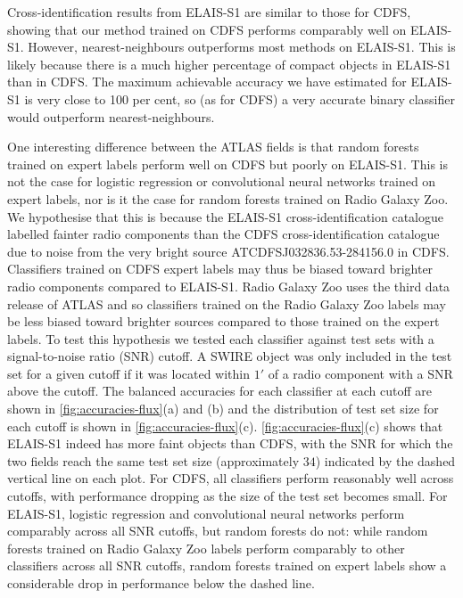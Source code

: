 \documentclass[fleqn,usenatbib,usedcolumn]{mnras}
\begin{document}
  Cross-identification results from ELAIS-S1 are similar to those for CDFS, showing that our method trained on CDFS performs comparably well on ELAIS-S1. However, nearest-neighbours outperforms most methods on ELAIS-S1. This is likely because there is a much higher percentage of compact objects in ELAIS-S1 than in CDFS. The maximum achievable accuracy we have estimated for ELAIS-S1 is very close to 100 per cent, so (as for CDFS) a very accurate binary classifier would outperform nearest-neighbours.

  One interesting difference between the ATLAS fields is that random forests trained on expert labels perform well on CDFS but poorly on ELAIS-S1. This is not the case for logistic regression or convolutional neural networks trained on expert labels, nor is it the case for random forests trained on Radio Galaxy Zoo. We hypothesise that this is because the ELAIS-S1 cross-identification catalogue \citep{middelberg08} labelled fainter radio components than the CDFS cross-identification catalogue \citep{norris06} due to noise from the very bright source ATCDFS\textunderscore{}J032836.53-284156.0 in CDFS. Classifiers trained on CDFS expert labels may thus be biased toward brighter radio components compared to ELAIS-S1. Radio Galaxy Zoo uses the third data release of ATLAS \citep{franzen15} and so classifiers trained on the Radio Galaxy Zoo labels may be less biased toward brighter sources compared to those trained on the expert labels. To test this hypothesis we tested each classifier against test sets with a signal-to-noise ratio (SNR) cutoff. A SWIRE object was only included in the test set for a given cutoff if it was located within $1'$ of a radio component with a SNR above the cutoff. The balanced accuracies for each classifier at each cutoff are shown in \autoref{fig:accuracies-flux}(a) and (b) and the distribution of test set size for each cutoff is shown in \autoref{fig:accuracies-flux}(c). \autoref{fig:accuracies-flux}(c) shows that ELAIS-S1 indeed has more faint objects than CDFS, with the SNR for which the two fields reach the same test set size (approximately $34$) indicated by the dashed vertical line on each plot. For CDFS, all classifiers perform reasonably well across cutoffs, with performance dropping as the size of the test set becomes small. For ELAIS-S1, logistic regression and convolutional neural networks perform comparably across all SNR cutoffs, but random forests do not: while random forests trained on Radio Galaxy Zoo labels perform comparably to other classifiers across all SNR cutoffs, random forests trained on expert labels show a considerable drop in performance below the dashed line.
\end{document}
